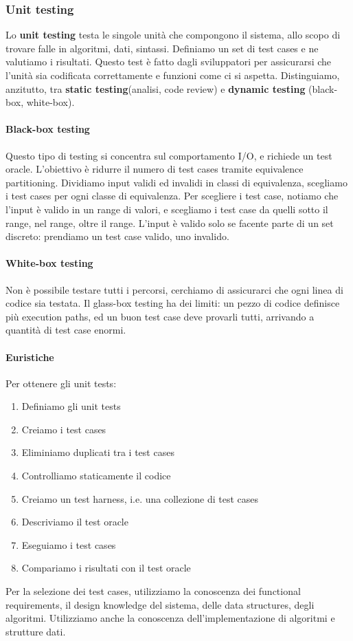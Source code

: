 \documentclass[11pt]{article}
\begin{document}
\subsubsection{Unit testing}
Lo \textbf{unit testing} testa le singole unità che compongono il sistema, allo scopo di trovare falle in algoritmi, dati, sintassi. Definiamo un set di test cases e ne valutiamo i risultati. Questo test è fatto dagli sviluppatori per assicurarsi che l'unità sia codificata correttamente e funzioni come ci si aspetta.
Distinguiamo, anzitutto, tra \textbf{static testing}(analisi, code review) e \textbf{dynamic testing} (black-box, white-box).
\paragraph{Black-box testing} Questo tipo di testing si concentra sul comportamento I/O, e richiede un test oracle. L'obiettivo è ridurre il numero di test cases  tramite equivalence partitioning. Dividiamo input validi ed invalidi in classi di equivalenza, scegliamo i test cases per ogni classe di equivalenza. Per scegliere i test case, notiamo che l'input è valido in un range di valori, e scegliamo i test case da quelli sotto il range, nel range, oltre il range. L'input è valido solo se facente parte di un set discreto: prendiamo un test case valido, uno invalido. 
\paragraph{White-box testing} Non è possibile testare tutti i percorsi, cerchiamo di assicurarci che ogni linea di codice sia testata. Il glass-box testing ha dei limiti: un pezzo di codice definisce più execution paths, ed un buon test case deve provarli tutti, arrivando a quantità di test case enormi. 
\paragraph{Euristiche} Per ottenere gli unit tests:
\begin{enumerate}
    \item Definiamo gli unit tests
    \item Creiamo i test cases 
    \item Eliminiamo duplicati tra i test cases 
    \item Controlliamo staticamente il codice 
    \item Creiamo un test harness, i.e. una collezione di test cases 
    \item Descriviamo il test oracle 
    \item Eseguiamo i test cases 
    \item Compariamo i risultati con il test oracle
\end{enumerate}
Per la selezione dei test cases, utilizziamo la conoscenza dei functional requirements, il design knowledge del sistema, delle data structures, degli algoritmi. Utilizziamo anche la conoscenza dell'implementazione di algoritmi e strutture dati. 
\end{document}
